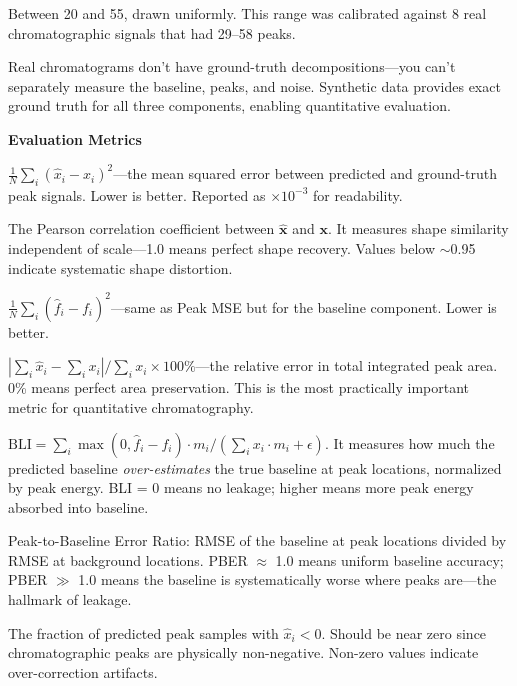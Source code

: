\documentclass[11pt, letterpaper]{article}
\begin{document}
{Between 20 and 55, drawn uniformly.  This range was calibrated against 8 real chromatographic signals that had 29--58 peaks.}

{Real chromatograms don't have ground-truth decompositions---you can't separately measure the baseline, peaks, and noise.  Synthetic data provides exact ground truth for all three components, enabling quantitative evaluation.}


\vspace{0.8em}
{\large\bfseries\sffamily\color{SectionBlue} Evaluation Metrics}\par\vspace{0.2em}

{$\frac{1}{N}\sum_i (\hat{x}_i - x_i)^2$---the mean squared error between predicted and ground-truth peak signals.  Lower is better.  Reported as $\times 10^{-3}$ for readability.}

{The Pearson correlation coefficient between $\hat{\mathbf{x}}$ and $\mathbf{x}$.  It measures shape similarity independent of scale---1.0 means perfect shape recovery.  Values below $\sim$0.95 indicate systematic shape distortion.}

{$\frac{1}{N}\sum_i (\hat{f}_i - f_i)^2$---same as Peak MSE but for the baseline component.  Lower is better.}

{$|\sum_i \hat{x}_i - \sum_i x_i| / \sum_i x_i \times 100\%$---the relative error in total integrated peak area.  0\% means perfect area preservation.  This is the most practically important metric for quantitative chromatography.}

{$\text{BLI} = \sum_i \max(0, \hat{f}_i - f_i) \cdot m_i / (\sum_i x_i \cdot m_i + \epsilon)$.  It measures how much the predicted baseline \emph{over-estimates} the true baseline at peak locations, normalized by peak energy.  BLI = 0 means no leakage; higher means more peak energy absorbed into baseline.}

{Peak-to-Baseline Error Ratio: RMSE of the baseline at peak locations divided by RMSE at background locations.  PBER $\approx$ 1.0 means uniform baseline accuracy; PBER $\gg$ 1.0 means the baseline is systematically worse where peaks are---the hallmark of leakage.}

{The fraction of predicted peak samples with $\hat{x}_i < 0$.  Should be near zero since chromatographic peaks are physically non-negative.  Non-zero values indicate over-correction artifacts.}
\end{document}
